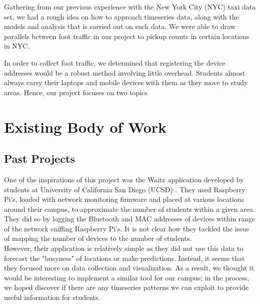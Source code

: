 \documentclass[journal, 12pt]{IEEEtran}
\begin{document}
\noindent Gathering from our previous experience with the New York City (NYC) taxi data set, we had a rough idea on how to approach timeseries data, along with the models and analysis that is carried out on such data. We were able to draw parallels between foot traffic in our project to pickup counts in certain locations in NYC.

\noindent In order to collect foot traffic, we determined that registering the device addresses would be a robust method involving little overhead. Students almost always carry their laptops and mobile devices with them as they move to study areas. Hence, our project focuses on two topics


\section{Existing Body of Work}
\subsection{Past Projects}
\noindent One of the inspirations of this project was the Waitz application developed by students at University of California San Diego (UCSD) \cite{waitz}. They used Raspberry Pi's, loaded with network monitoring firmware and placed at various locations around their campus, to approximate the number of students within a given area. They did so by logging the Bluetooth and MAC addresses of devices within range of the network sniffing Raspberry Pi's. It is not clear how they tackled the issue of mapping the number of devices to the number of students.\\


\noindent However, their application is relatively simple as they did not use this data to forecast the "busyness" of locations or make predictions. Instead, it seems that they focused more on data collection and visualization. As a result, we thought it would be interesting to implement a similar tool for our campus; in the process, we hoped discover if there are any timeseries patterns we can exploit to provide useful information for students.
\end{document}
